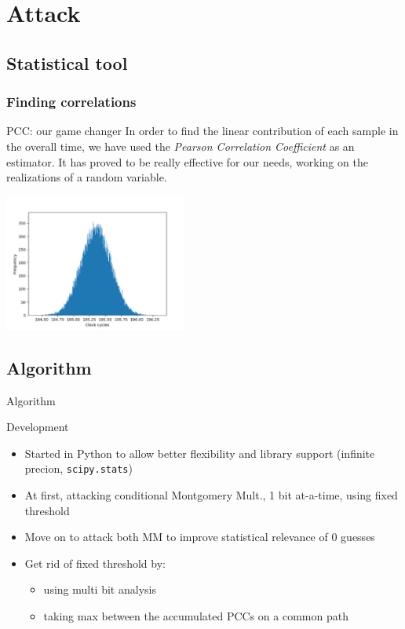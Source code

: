 \documentclass{beamer}
\begin{document}

\section{Attack}
\subsection{Statistical tool}
\begin{frame}[fragile]
	\frametitle{Finding correlations}
	\begin{block}{PCC: our game changer}
		In order to find the linear contribution of each sample in the overall time, we have used the \textit{Pearson Correlation Coefficient} as an estimator. It has proved to be really effective for our needs, working on the realizations of a random variable.
	\end{block}
	\begin{center}
		\includegraphics[width=6cm]{./graphics/rand_distr}
	\end{center}
\end{frame}

\subsection{Algorithm}

\begin{frame}{Algorithm}
    \begin{block}{Development}
        \begin{itemize}
            \pause \item Started in Python to allow better flexibility and library support (infinite precion, \texttt{scipy.stats})
            \pause \item At first, attacking conditional Montgomery Mult., 1 bit at-a-time, using fixed threshold
            \pause \item Move on to attack both MM to improve statistical relevance of 0 guesses
            \pause \item Get rid of fixed threshold by:
            \begin{itemize}
              \item using multi bit analysis
              \item taking max between the accumulated PCCs on a common path
            \end{itemize}
        \end{itemize}
    \end{block}
\end{frame}
\end{document}
